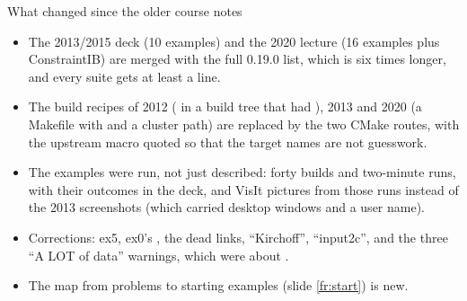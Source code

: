 \documentclass[aspectratio=169,11pt]{beamer}
\begin{document}
\begin{frame}{What changed since the older course notes}
\label{fr:changed}
\footnotesize
\begin{itemize}
  \item The 2013/2015 deck (10 examples) and the 2020 lecture (16 examples plus ConstraintIB) are merged with the full 0.19.0 list, which is six times longer, and every suite gets at least a line.
  \item The build recipes of 2012 ( in a build tree that had ), 2013 and 2020 (a Makefile with  and a cluster path) are replaced by the two CMake routes, with the upstream macro quoted so that the target names are not guesswork.
  \item The examples were run, not just described: forty builds and two-minute runs, with their outcomes in the deck, and VisIt pictures from those runs instead of the 2013 screenshots (which carried desktop windows and a user name).
  \item Corrections: ex5, ex0's , the dead links, ``Kirchoff'', ``input2c'', and the three ``A LOT of data'' warnings, which were about .
  \item The map from problems to starting examples (slide \ref{fr:start}) is new.
\end{itemize}
\end{frame}
\end{document}

